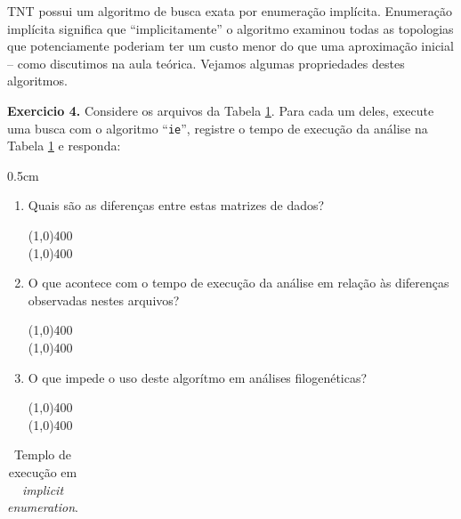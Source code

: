 \begin{refsection}
TNT possui um algoritmo de busca exata por enumeração implícita. Enumeração implícita significa que ``implicitamente'' o algoritmo examinou todas as topologias que potenciamente poderiam ter um custo menor do que uma aproximação inicial -- como discutimos na aula teórica. Vejamos algumas propriedades destes algoritmos.\\

\begin{blackBlock}{\textbf{Exercicio 4.}}\label{tut4:ex:4.7}
	Considere os arquivos da Tabela \ref{tut4:table:ie}. Para cada um deles, execute uma busca com o algoritmo ``\texttt{ie}'', registre o tempo de execução da análise na Tabela \ref{tut4:table:ie} e responda: 

\begin {myindentpar}{0.5cm}
\begin{enumerate}[\itshape a.]
	\item{Quais são as diferenças entre estas matrizes de dados?}
\begin{center}
\line(1,0){400}\\
\line(1,0){400}\\
\end{center}

	\item{O que acontece com o tempo de execução da análise em relação às diferenças observadas nestes arquivos?}
\begin{center}
\line(1,0){400}\\
\line(1,0){400}\\
\end{center}

	\item{O que impede o uso deste algorítmo em análises filogenéticas?}
\begin{center}
\line(1,0){400}\\
\line(1,0){400}\\
\end{center}

\end{enumerate}
\end{myindentpar}

\end{blackBlock}

\pagestyle{fancy}
\begin{center}

\begin{longtable}{lcccccc}
\caption[Tabela \ref{tut4:table:ie}: Templo de execução em \textit{implicit enumeration}]{Templo de execução em \textit{implicit enumeration}.} \label{tut4:table:ie} \\



\end{longtable}
\end{center}
\end{refsection}
